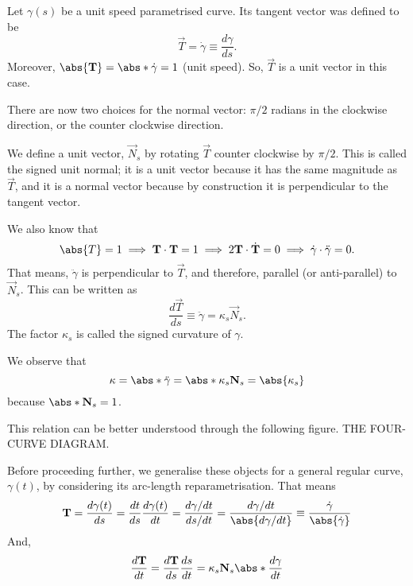 \documentclass[11pt]{penrose}
\newcommand{\vT}{\vec{T}}
\newcommand{\vN}{\vec{N}}
\newcommand{\missing}[1]{{\color{red}#1}}
\begin{document}
Let $\gamma(s)$ be a unit speed parametrised curve. Its tangent vector was defined to be
\begin{equation}
    \vT = \dot{\gamma} \equiv \frac{d\gamma}{ds}.
\end{equation}
Moreover, $\abs{\vT} = \abs*{\dot{\gamma}} = 1$ (unit speed). So, $\vT$ is a unit vector in this case.

There are now two choices for the normal vector: $\pi/2$ radians in the clockwise direction, or the counter clockwise direction.

We define a unit vector, $\vN_s$ by rotating $\vT$ counter clockwise by $\pi/2$. This is called the signed unit normal; it is a unit vector because it has the same magnitude as $\vT$, and it is a normal vector because by construction it is perpendicular to the tangent vector.

We also know that
\begin{equation}
    \abs{T} = 1
    \implies \vT \cdot \vT = 1
    \implies 2 \vT \cdot \dot{\vT} = 0
    \implies \dot{\gamma} \cdot \ddot{\gamma} = 0.
\end{equation}
That means, $\ddot{\gamma}$ is perpendicular to $\vT$, and therefore, parallel (or anti-parallel) to $\vN_s$. This can be written as
\begin{equation}
    \frac{d\vT}{ds} \equiv \ddot{\gamma} = \kappa_s \vN_s.
\end{equation}
The factor $\kappa_s$ is called the signed curvature of $\gamma$.

We observe that
\begin{equation}
    \kappa = \abs*{\ddot{\gamma}} = \abs*{\kappa_s \vN_s} = \abs{\kappa_s}
\end{equation}
because $\abs*{\vN_s} = 1$.

This relation can be better understood through the following figure. \missing{THE FOUR-CURVE DIAGRAM.}

Before proceeding further, we generalise these objects for a general regular curve, $\gamma(t)$, by considering its arc-length reparametrisation. That means
\begin{equation}
    \vT
    = \frac{d\gamma(t)}{ds}
    = \frac{dt}{ds} \frac{d\gamma(t)}{dt}
    = \frac{d\gamma/dt}{ds/dt}
    = \frac{d\gamma/dt}{\abs{d\gamma/dt}}
    \equiv \frac{\dot{\gamma}}{\abs{\dot{\gamma}}}
\end{equation}
And,
\begin{equation*}
    \frac{d\vT}{dt}
    = \frac{d\vT}{ds} \frac{ds}{dt}
    = \kappa_s \vN_s \abs*{\frac{d\gamma}{dt}}
\end{equation*}
\end{document}

